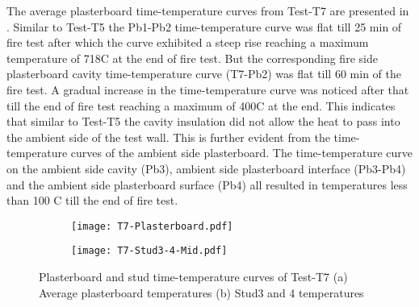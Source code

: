 The average plasterboard time-temperature curves from Test-T7 are presented in . Similar to Test-T5 the Pb1-Pb2 time-temperature curve was flat till 25 min of fire test after which the curve exhibited a steep rise reaching a maximum temperature of 718\degree C at the end of fire test. But the corresponding fire side plasterboard cavity time-temperature curve (T7-Pb2) was flat till 60 min of the fire test. A gradual increase in the time-temperature curve was noticed after that till the end of fire test reaching a maximum of 400\degree C at the end. This indicates that similar to Test-T5 the cavity insulation did not allow the heat to pass into the ambient side of the test wall. This is further evident from the time-temperature curves of the ambient side plasterboard. The time-temperature curve on the ambient side cavity (Pb3), ambient side plasterboard interface (Pb3-Pb4) and the ambient side plasterboard surface (Pb4) all resulted in temperatures less than 100 \degree C till the end of fire test.
\begin{figure}[!htbp]
	\centering
	\begin{subfigure}[b]{0.7\textwidth}
		\centering
		\texttt{[image: T7-Plasterboard.pdf]}
		\caption{}
		\label{subfig:T7-Plasterboard}
	\end{subfigure}
	\begin{subfigure}[b]{0.7\textwidth}
		\centering
		\texttt{[image: T7-Stud3-4-Mid.pdf]}
		\caption{}
		\label{subfig:T7-Stud3-4-Top}
	\end{subfigure}
	   \caption{Plasterboard and stud time-temperature curves of Test-T7 (a) Average plasterboard temperatures (b) Stud3 and 4 temperatures}
	   \label{fig:T7-PB-Stud}
\end{figure}

